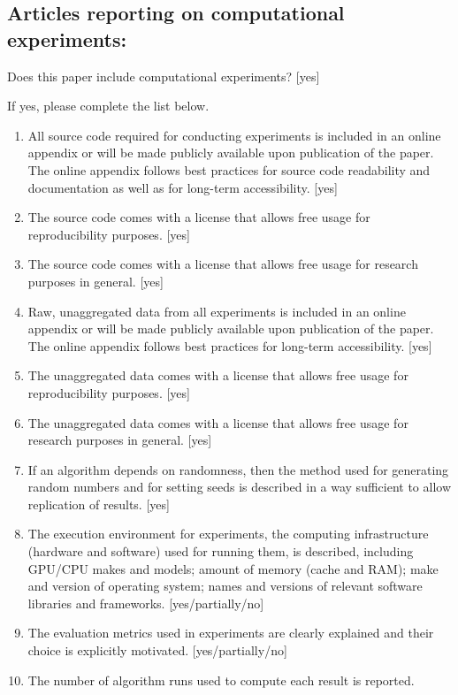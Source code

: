 \documentclass[manuscript, screen, review]{jair}
\begin{document}
\subsection*{Articles reporting on computational experiments:}
Does this paper include computational experiments? [yes]

If yes, please complete the list below.
\begin{enumerate}
    \item 
    All source code required for conducting experiments is included in an online appendix 
    or will be made publicly available upon publication of the paper.
    The online appendix follows best practices for source code readability and documentation as well as for long-term accessibility.
    [yes]
    \item The source code comes with a license that
    allows free usage for reproducibility purposes.
    [yes]
    \item The source code comes with a license that
    allows free usage for research purposes in general.
    [yes]
    \item 
    Raw, unaggregated data from all experiments is included in an online appendix 
    or will be made publicly available upon publication of the paper.
    The online appendix follows best practices for long-term accessibility.
    [yes]
    \item The unaggregated data comes with a license that
    allows free usage for reproducibility purposes.
    [yes]
    \item The unaggregated data comes with a license that
    allows free usage for research purposes in general.
    [yes]
    \item If an algorithm depends on randomness, then the method used for generating random numbers and for setting seeds is described in a way sufficient to allow replication of results. 
    [yes]
    \item The execution environment for experiments, the computing infrastructure (hardware and software) used for running them, is described, including GPU/CPU makes and models; amount of memory (cache and RAM); make and version of operating system; names and versions of relevant software libraries and frameworks. 
    [yes/partially/no]
    \item 
    The evaluation metrics used in experiments are clearly explained and their choice is explicitly motivated. 
    [yes/partially/no]
    \item 
    The number of algorithm runs used to compute each result is reported. 

\end{enumerate}
\end{document}
